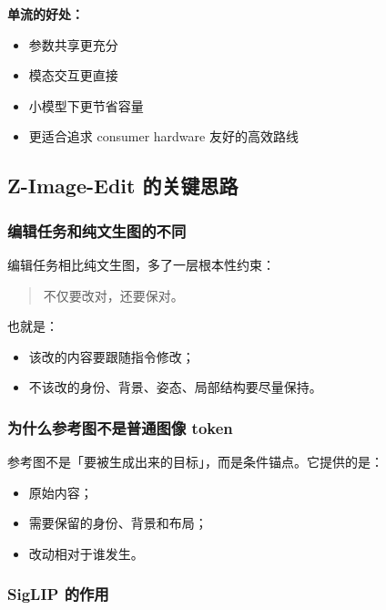 \begin{summarybox}
\textbf{单流的好处：}
\begin{itemize}[leftmargin=1.5em]
  \item 参数共享更充分
  \item 模态交互更直接
  \item 小模型下更节省容量
  \item 更适合追求 consumer hardware 友好的高效路线
\end{itemize}
\end{summarybox}

\subsection{Z-Image-Edit 的关键思路}

\subsubsection{编辑任务和纯文生图的不同}

编辑任务相比纯文生图，多了一层根本性约束：

\begin{quote}
不仅要改对，还要保对。
\end{quote}

也就是：

\begin{itemize}[leftmargin=1.5em]
  \item 该改的内容要跟随指令修改；
  \item 不该改的身份、背景、姿态、局部结构要尽量保持。
\end{itemize}

\subsubsection{为什么参考图不是普通图像 token}

参考图不是「要被生成出来的目标」，而是条件锚点。它提供的是：

\begin{itemize}[leftmargin=1.5em]
  \item 原始内容；
  \item 需要保留的身份、背景和布局；
  \item 改动相对于谁发生。
\end{itemize}

\subsubsection{SigLIP 的作用}

